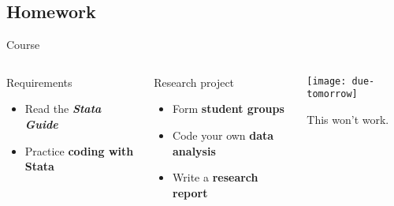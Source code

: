 \documentclass[t]{beamer}
\begin{document}
  \subsection{Homework}


  \begin{frame}[t]{Course }

  \begin{columns}[T]


    \begin{block}{Requirements}
      \begin{itemize}
        \item Read the \textbf{\emph{Stata Guide}}
        \item Practice \textbf{coding with Stata}
      \end{itemize}
    \end{block}

    \begin{alertblock}{Research project}
      \begin{itemize}
        \item Form \textbf{student groups}
        \item Code your own \textbf{data analysis}
        \item Write a \textbf{research report}
      \end{itemize}
    \end{alertblock}


    \begin{center}
      \texttt{[image: due-tomorrow]}\vspace{1em}

      This won't work.
    \end{center}

  \end{columns}

  \end{frame}
\end{document}
